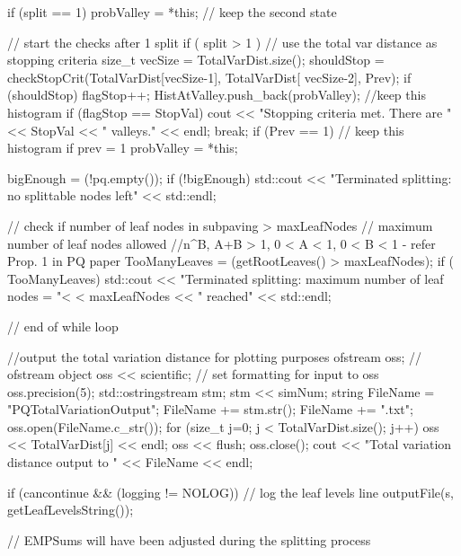 \begin{DoxyCode}
{{{        if (split == 1) { probValley = *this; } // keep the second state

        // start the checks after 1 split
        if ( split > 1 ) {
          // use the total var distance as stopping criteria
          size_t vecSize = TotalVarDist.size();
          shouldStop = checkStopCrit(TotalVarDist[vecSize-1], TotalVarDist[
      vecSize-2], Prev);
          if (shouldStop) { 
            flagStop++; 
            HistAtValley.push_back(probValley); //keep this histogram
          }
          if (flagStop == StopVal) { 
            cout << "Stopping criteria met. There are " << StopVal << "
       valleys." << endl;
            break; 
          }
          if (Prev == 1) // keep this histogram if prev = 1 
            { probValley = *this; }
        }
        
            bigEnough = (!pq.empty());
            if (!bigEnough)
                std::cout << "Terminated splitting: no splittable nodes left"
                    << std::endl;

        // check if number of leaf nodes in subpaving > maxLeafNodes
        // maximum number of leaf nodes allowed
        //n^B, A+B > 1, 0  < A < 1, 0 < B < 1 - refer Prop. 1 in PQ paper
        TooManyLeaves = (getRootLeaves() > maxLeafNodes);
        if ( TooManyLeaves) {
          std::cout << "Terminated splitting: maximum number of leaf nodes = "<
      < maxLeafNodes << " reached"
                          << std::endl;
        }  
      } // end of while loop

      //output the total variation distance for plotting purposes
      ofstream oss;         // ofstream object
      oss << scientific;  // set formatting for input to oss
      oss.precision(5);
      std::ostringstream stm;
      stm << simNum;
      string FileName = "PQTotalVariationOutput";
      FileName += stm.str();
      FileName += ".txt";
      oss.open(FileName.c_str());
      for (size_t j=0; j < TotalVarDist.size(); j++) {
        oss << TotalVarDist[j] << endl;
      }
      oss << flush;
      oss.close();
      cout << "Total variation distance output to " << FileName << endl;

      if (cancontinue && (logging != NOLOG)) {
            // log the leaf levels line
            outputFile(s, getLeafLevelsString());
      }

        // EMPSums will have been adjusted during the splitting process
   }

}
\end{DoxyCode}

